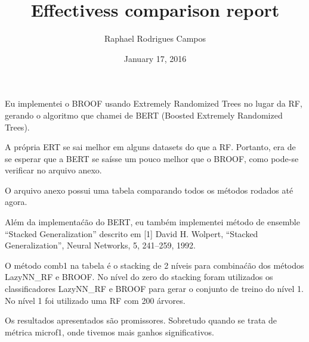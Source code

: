 \documentclass[]{article}
\title{Effectivess comparison report}
\author{Raphael Rodrigues Campos}
\date{January 17, 2016}
\begin{document}
\maketitle


Eu implementei o BROOF usando Extremely Randomized Trees no lugar da RF,
gerando o algoritmo que chamei de BERT (Boosted Extremely Randomized
Trees).

A própria ERT se sai melhor em alguns datasets do que a RF. Portanto,
era de se esperar que a BERT se saísse um pouco melhor que o BROOF, como
pode-se verificar no arquivo anexo.

O arquivo anexo possui uma tabela comparando todos os métodos rodados
até agora.

Além da implementaćão do BERT, eu também implementei método de ensemble
``Stacked Generalization'' descrito em {[}1{]} David H. Wolpert,
``Stacked Generalization'', Neural Networks, 5, 241--259, 1992.

O método comb1 na tabela é o stacking de 2 níveis para combinaćão dos
métodos LazyNN\_RF e BROOF. No nível do zero do stacking foram
utilizados os classificadores LazyNN\_RF e BROOF para gerar o conjunto
de treino do nível 1. No nível 1 foi utilizado uma RF com 200 árvores.

Os resultados apresentados são promissores. Sobretudo quando se trata de
métrica microf1, onde tivemos mais ganhos significativos.
\end{document}
